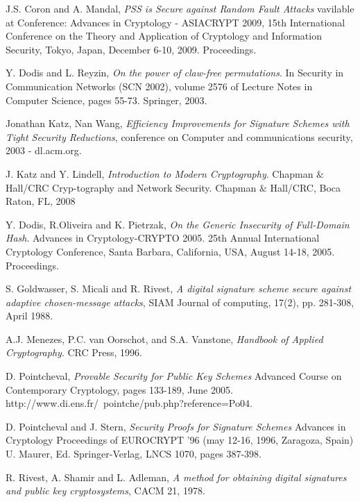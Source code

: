 \documentclass[a4paper,11pt]{article}
\begin{document}
\begin{thebibliography}{10}
 J.S. Coron and A. Mandal, \emph{PSS is Secure against Random Fault Attacks} vavilable at Conference: Advances in Cryptology - ASIACRYPT 2009, 15th International Conference on the Theory and Application of Cryptology and Information Security, Tokyo, Japan, December 6-10, 2009. Proceedings.

 Y. Dodis and L. Reyzin, \emph{On the power of claw-free permutations}. In Security in Communication Networks (SCN 2002), volume 2576 of Lecture Notes in Computer Science, pages 55-73. Springer, 2003.

 Jonathan Katz, Nan Wang,
\emph{Efficiency Improvements for Signature Schemes
with Tight Security Reductions}, conference on Computer and communications security, 2003 - dl.acm.org.

 J. Katz and Y. Lindell, \emph{Introduction to Modern Cryptography}. Chapman $\&$ Hall/CRC Cryp-tography and Network Security. Chapman $\&$ Hall/CRC, Boca Raton, FL, 2008

 Y. Dodis,  R.Oliveira and K. Pietrzak, \emph{On the Generic Insecurity of Full-Domain Hash}. Advances in Cryptology-CRYPTO 2005. 25th Annual International Cryptology Conference, Santa Barbara, California, USA, August 14-18, 2005. Proceedings.

 S. Goldwasser, S. Micali and R. Rivest, \emph{A digital signature scheme secure against
adaptive chosen-message attacks}, SIAM Journal of computing, 17(2), pp. 281-308, April 1988.

 A.J. Menezes, P.C. van Oorschot, and S.A. Vanstone, \emph{Handbook of Applied Cryptography}. CRC Press, 1996.

 D. Pointcheval, \emph{Provable Security for Public Key Schemes} Advanced Course on Contemporary Cryptology, pages 133-189, June 2005. http://www.di.ens.fr/~pointche/pub.php?reference=Po04.


 D. Pointcheval and J. Stern, \emph{Security Proofs for Signature Schemes} Advances in Cryptology  Proceedings of EUROCRYPT '96 (may 12-16, 1996, Zaragoza, Spain) U. Maurer, Ed. Springer-Verlag, LNCS 1070, pages 387-398.

 R. Rivest, A. Shamir and L. Adleman, \emph{A method for obtaining digital signatures and public key cryptosystems}, CACM 21, 1978.






\end{thebibliography}
\end{document}
